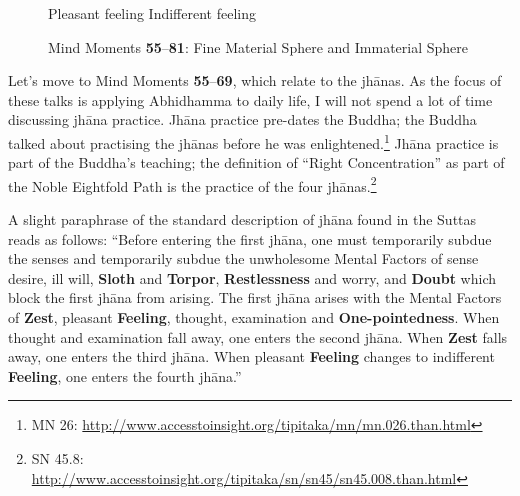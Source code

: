 \begin{figure}[H]
\begin{center}
\smiley\hspace{2mm} Pleasant feeling\hspace{5mm}\neutral\hspace{2mm} Indifferent feeling
\end{center}

\caption{Mind Moments \textbf{55}--\textbf{81}: Fine Material Sphere and Immaterial Sphere}
\label{fig:55to81}
\end{figure}

Let’s move to Mind Moments \textbf{55}--\textbf{69}, which relate to the jhānas. As the focus of these talks is applying Abhidhamma to daily life, I will not spend a lot of time discussing jhāna practice. Jhāna practice pre-dates the Buddha; the Buddha talked about practising the jhānas before he was enlightened.\footnote{MN 26: \url{http://www.accesstoinsight.org/tipitaka/mn/mn.026.than.html}} Jhāna practice is part of the Buddha’s teaching; the definition of “Right Concentration” as part of the Noble Eightfold Path is the practice of the four jhānas.\footnote{SN 45.8: \url{http://www.accesstoinsight.org/tipitaka/sn/sn45/sn45.008.than.html}}

A slight paraphrase of the standard description of jhāna found in the Suttas reads as follows: “Before entering the first jhāna, one must temporarily subdue the senses and temporarily subdue the unwholesome Mental Factors of sense desire, ill will, \textbf{Sloth} and \textbf{Torpor}, \textbf{Restlessness} and worry, and \textbf{Doubt} which block the first jhāna from arising. The first jhāna arises with the Mental Factors of \textbf{Zest}, pleasant \textbf{Feeling}, thought, examination and \textbf{One-pointedness}. When thought and examination fall away, one enters the second jhāna. When \textbf{Zest} falls away, one enters the third jhāna. When pleasant \textbf{Feeling} changes to indifferent \textbf{Feeling}, one enters the fourth jhāna.”

